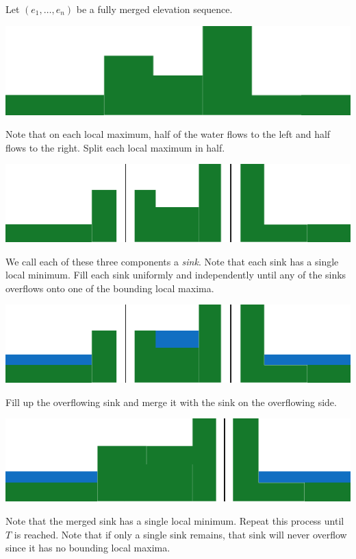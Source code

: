 \documentclass[11pt,a4paper]{article}
\begin{document}
Let $(e_1,\ldots,e_n)$ be a fully merged elevation sequence.
\begin{center}
  \includegraphics{im8.pdf}
\end{center}
Note that on each local maximum, half of the water flows to the left and half flows to the right.
Split each local maximum in half.
\begin{center}
  \includegraphics{im9.pdf}
\end{center}
We call each of these three components a \textit{sink}.
Note that each sink has a single local minimum.
Fill each sink uniformly and independently until any of the sinks overflows onto one of the bounding local maxima.
\begin{center}
  \includegraphics{im10.pdf}
\end{center}
Fill up the overflowing sink and merge it with the sink on the overflowing side.
\begin{center}
  \includegraphics{im12.pdf}
\end{center}
Note that the merged sink has a single local minimum.
Repeat this process until $T$ is reached.
Note that if only a single sink remains, that sink will never overflow since it has no bounding local maxima.
\end{document}
